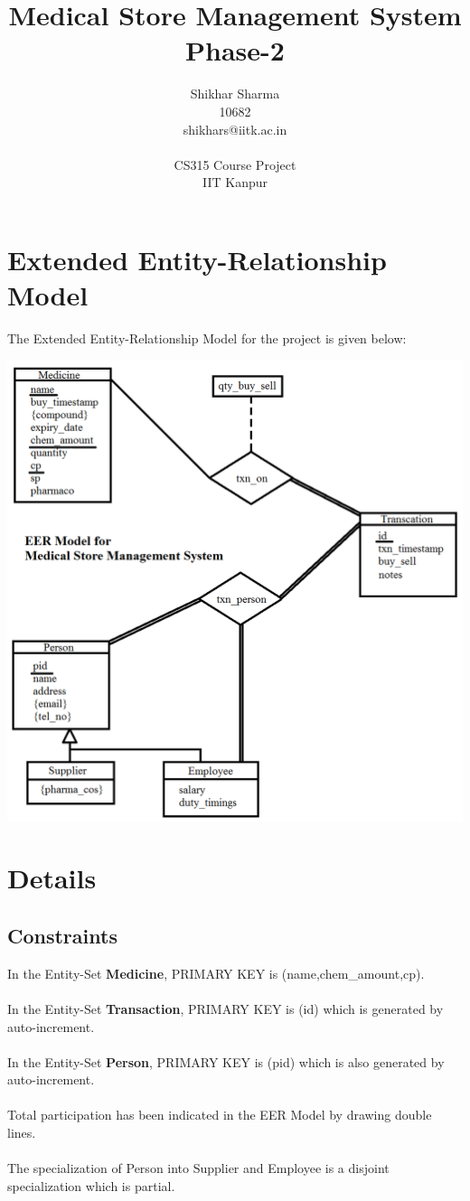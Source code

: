 \documentclass[a4papaer]{article}
\title{{\bf Medical Store Management System}\\Phase-2}
\author{Shikhar Sharma\\10682\\shikhars@iitk.ac.in\\\\CS315 Course Project\\IIT Kanpur}
\begin{document}
\maketitle
\tableofcontents

\newpage
\section{Extended Entity-Relationship Model}
The Extended Entity-Relationship Model for the project is given below:\\
\hspace*{-30mm}
{\includegraphics[width=180mm]{eerd.png}

\section{Details}
\subsection{Constraints}
In the Entity-Set {\bf Medicine}, PRIMARY KEY is (name,chem\_amount,cp).\\\\
In the Entity-Set {\bf Transaction}, PRIMARY KEY is (id) which is generated by auto-increment.\\\\
In the Entity-Set {\bf Person}, PRIMARY KEY is (pid) which is also generated by auto-increment.\\\\
Total participation has been indicated in the EER Model by drawing double lines.\\\\
The specialization of Person into Supplier and Employee is a disjoint specialization which is partial.

}
\end{document}
